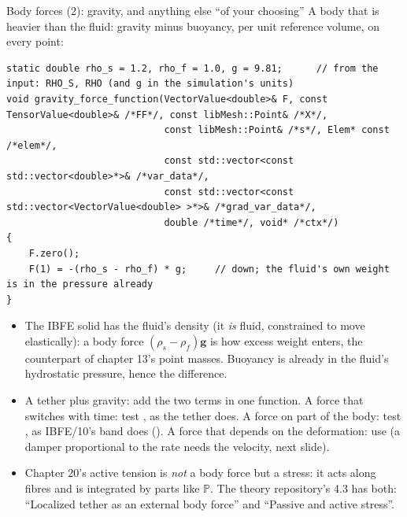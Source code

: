 \documentclass[aspectratio=169,11pt]{beamer}
\begin{document}
\begin{frame}[fragile]{Body forces (2): gravity, and anything else ``of your choosing''}
\label{fr:gravity}
\footnotesize
A body that is heavier than the fluid: gravity minus buoyancy, per unit reference volume, on every point:
\begin{lstlisting}[style=cpptiny]
static double rho_s = 1.2, rho_f = 1.0, g = 9.81;      // from the input: RHO_S, RHO (and g in the simulation's units)
void gravity_force_function(VectorValue<double>& F, const TensorValue<double>& /*FF*/, const libMesh::Point& /*X*/,
                            const libMesh::Point& /*s*/, Elem* const /*elem*/,
                            const std::vector<const std::vector<double>*>& /*var_data*/,
                            const std::vector<const std::vector<VectorValue<double> >*>& /*grad_var_data*/,
                            double /*time*/, void* /*ctx*/)
{
    F.zero();
    F(1) = -(rho_s - rho_f) * g;     // down; the fluid's own weight is in the pressure already
}
\end{lstlisting}
\begin{itemize}
  \item The IBFE solid has the fluid's density (it \emph{is} fluid, constrained to move elastically): a body force $(\rho_s - \rho_f)\mathbf{g}$ is how excess weight enters, the counterpart of chapter 13's point masses. Buoyancy is already in the fluid's hydrostatic pressure, hence the difference.
  \item A tether plus gravity: add the two terms in one function. A force that switches with time: test , as the tether does. A force on part of the body: test , as IBFE/10's band does (). A force that depends on the deformation: use  (a damper proportional to the rate needs the velocity, next slide).
  \item Chapter 20's active tension is \emph{not} a body force but a stress: it acts along fibres and is integrated by parts like $\mathbb{P}$. The theory repository's 4.3 has both: ``Localized tether as an external body force'' and ``Passive and active stress''.
\end{itemize}
\end{frame}
\end{document}
